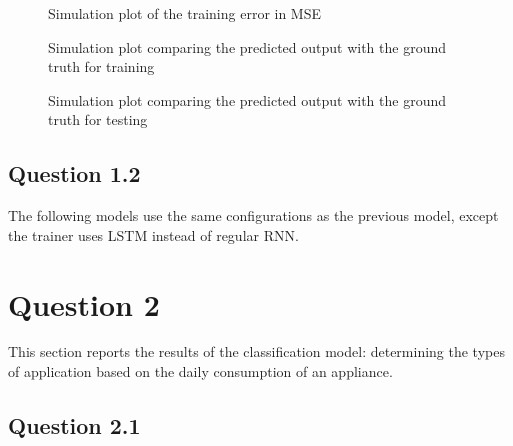 \documentclass[a4paper, article, oneside, USenglish, IN5460]{memoir}
\begin{document}
\begin{figure}[h]
  \centering
  \caption{Simulation plot of the training error in MSE}
\end{figure}

\begin{figure}[h]
  \centering
  \caption{Simulation plot comparing the predicted output with the ground truth for training}
\end{figure}

\begin{figure}[h]
  \centering
  \caption{Simulation plot comparing the predicted output with the ground truth for testing}
\end{figure}




\section{Question 1.2}

The following models use the same configurations as the previous model, except the trainer uses LSTM instead of regular RNN.


\chapter{Question 2}

This section reports the results of the classification model: determining the types of application based on the daily consumption of an appliance.

\section{Question 2.1}

\end{document}
